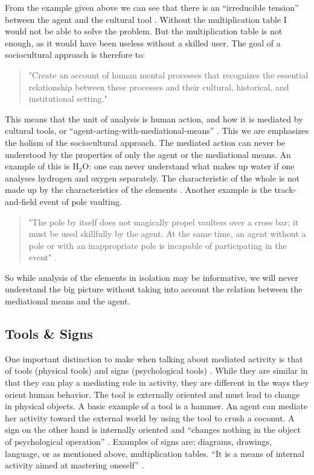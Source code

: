 From the example given above we can see that there is an “irreducible tension” between the agent and the cultural tool \citep{wertsch1998mind}. Without the multiplication table I would not be able to solve the problem. But the multiplication table is not enough, as it would have been useless without a skilled user. The goal of a sociocultural approach is therefore to: 

\begin{quote}
"Create an account of human mental processes that recognizes the essential relationship between these processes and their cultural, historical, and institutional setting."\citep{wertsch1998mind} 
\end{quote}

This means that the unit of analysis is human action, and how it is mediated by cultural tools, or “agent-acting-with-mediational-means” \citep[\citealp{wertsch1993sociocultural} cited in][]{wertsch1998mind}. This we are emphasizes the holism of the sociocultural approach. The mediated action can never be understood by the properties of only the agent or the mediational means. An example of this is $\text{H}_2\text{O}$: one can never understand what makes up water if one analyses hydrogen and oxygen separately. The characteristic of the whole is not made up by the characteristics of the elements \citep{vygotskiui1978mind}. Another example is the track-and-field event of pole vaulting. 
\begin{quote}
"The pole by itself does not magically propel vaulters over a cross bar; it must be used skillfully by the agent. At the same time, an agent without a pole or with an inappropriate pole is incapable of participating in the event" \citep{wertsch1998mind}. 
\end{quote}
So while analysis of the elements in isolation may be informative, we will never understand the big picture without taking into account the relation between the mediational means and the agent.  

\subsection{Tools \& Signs}
One important distinction to make when talking about mediated activity is that of tools (physical tools) and signs (psychological tools) \citep{vygotskiui1978mind}. While they are similar in that they can play a mediating role in activity, they are different in the ways they orient human behavior. The tool is externally oriented and must lead to change in physical objects. A basic example of a tool is a hammer. An agent can mediate her activity toward the external world by using the tool to crush a coconut. A sign on the other hand is internally oriented and “changes nothing in the object of psychological operation” \citep{vygotskiui1978mind}. Examples of signs are: diagrams, drawings, language, or as mentioned above, multiplication tables. “It is a means of internal activity aimed at mastering oneself” \citep{vygotskiui1978mind}. 


